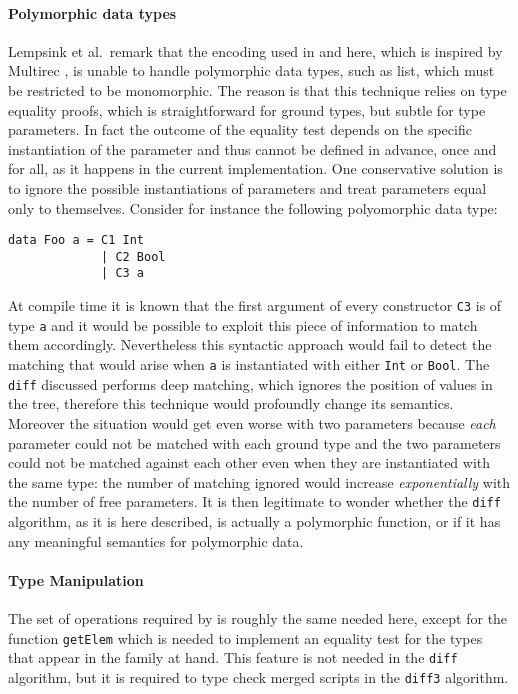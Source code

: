 \documentclass[../Thesis.tex]{subfiles}
\begin{document}
	\paragraph{Polymorphic data types}
	Lempsink et al.\ remark that the encoding used in \cite{Lemp09} and here,
	which is inspired by Multirec \cite{Multirec}, is unable to handle 
	polymorphic data types, such as list, which must be restricted to be 
	monomorphic.
	The reason is that this technique relies on type equality proofs,
	which is straightforward for ground types, but subtle for type parameters.
	In fact the outcome of the equality test depends on the specific
	instantiation of the parameter and thus cannot be defined in advance, once
	and for all, as it happens in the current implementation.
	One conservative solution is to ignore the possible instantiations of 
	parameters and treat parameters equal only to themselves.
	Consider for instance the following polyomorphic data type:
	
\begin{verbatim}
data Foo a = C1 Int
             | C2 Bool
             | C3 a
\end{verbatim}
	At compile time it is known that the first argument of every constructor 
	\texttt{C3} is of type \texttt{a} and it would be possible to 
	exploit this piece of information	to match them accordingly.
	Nevertheless this syntactic approach would fail to detect the matching
	that would arise when \texttt{a} is instantiated with either \texttt{Int} or 
	\texttt{Bool}.
	The \texttt{diff} discussed performs deep matching, which ignores
	the position of values in the tree, therefore this technique would
	profoundly change its semantics. Moreover the situation would get even
	worse with two parameters because \emph{each} parameter could not be
	matched with each ground type and the two parameters could not
	be matched against each other even when they are instantiated with the
	same type: the number of matching ignored would increase 
	\emph{exponentially} with the number of free parameters.
	It is then legitimate to wonder whether the \texttt{diff} algorithm, as it
	is here described, is actually a polymorphic function, or if 	it has any 
	meaningful semantics for polymorphic data.
	

	\paragraph{Type Manipulation}
	The set of operations required by \cite{Lemp09} is roughly the
	same needed here, except for the function \texttt{getElem} which 
	is needed to implement an equality test for the types that appear
	in the family at hand. This feature is not needed in the \texttt{diff}
	algorithm, but it is required to type check merged scripts in the
	\texttt{diff3} algorithm.
	
\end{document}
